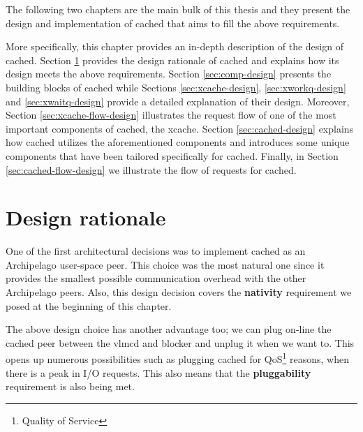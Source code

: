 The following two chapters are the main bulk of this thesis and they present 
the design and implementation of cached that aims to fill the above 
requirements.

More specifically, this chapter provides an in-depth description of the design 
of cached. Section \ref{sec:rationale-design} provides the design rationale of 
cached and explains how its design meets the above requirements. Section 
\ref{sec:comp-design} presents the building blocks of cached while Sections 
\ref{sec:xcache-design}, \ref{sec:xworkq-design} and \ref{sec:xwaitq-design} 
provide a detailed explanation of their design. Moreover, Section 
\ref{sec:xcache-flow-design} illustrates the request flow of one of the most 
important components of cached, the xcache. Section \ref{sec:cached-design} 
explains how cached utilizes the aforementioned components and introduces some 
unique components that have been tailored specifically for cached. Finally, in 
Section \ref{sec:cached-flow-design} we illustrate the flow of requests for 
cached.

\section{Design rationale}\label{sec:rationale-design}

One of the first architectural decisions was to implement cached as an 
Archipelago user-space peer.  This choice was the most natural one since it 
provides the smallest possible communication overhead with the other 
Archipelago peers. Also, this design decision covers the \textbf{nativity} 
requirement we posed at the beginning of this chapter.

The above design choice has another advantage too; we can plug on-line the 
cached peer between the vlmcd and blocker and unplug it when we want to. This 
opens up numerous possibilities such as plugging cached for 
QoS\footnote{Quality of Service} reasons, when there is a peak in I/O requests.  
This also means that the \textbf{pluggability} requirement is also being met.

\begin{comment}
This is possible because, as we have mentioned in Section \ref{sec:arch-ipc}, 
XSEG ports can be registered on-line. Thus, during normal operation, the 
administrator can add the cached port to the request path between vlmcd and 
blocker, and all requests will seamlessly be intercepted by cached. This 
follows the same principle with bcache, which plugs its own request\_fn() 
function to the virtual device it creates.  Unlike bcache however, cached can 
be plugged on and off at any time.
\end{comment}

